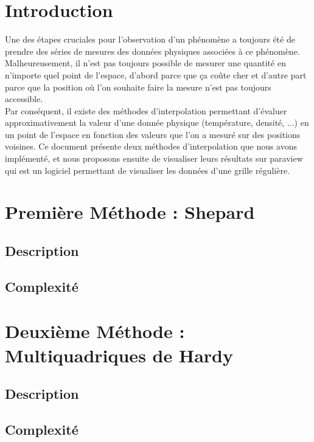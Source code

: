 \documentclass[a4paper,9pt]{article}
\begin{document}
\section{Introduction}
\label{sec:introduction}
Une des étapes cruciales pour l'observation d'un phénomène a toujours été de prendre des séries de mesures des données physiques associées à ce phénomène. Malheureusement, il n'est pas toujours possible de mesurer une quantité en n'importe quel point de l'espace, d'abord parce que ça coûte cher et d'autre part parce que la position où l'on souhaite faire la mesure n'est pas toujours accessible.\\ Par conséquent, il existe des méthodes d'interpolation permettant d'évaluer approximativement la valeur d'une donnée physique (température, densité, ...) en un point de l'espace en fonction des valeurs que l'on a mesuré sur des positions voisines. Ce document présente deux méthodes d'interpolation que nous avons implémenté, et nous proposons ensuite de visualiser leurs résultats sur paraview qui est un logiciel permettant de visualiser les données d'une grille régulière.

\section{Première Méthode : Shepard}
\label{sec:shepard}

\subsection{Description}
\label{subsec:shepard_description}

\subsection{Complexité}
\label{subsec:shepard_complexite}

\section{Deuxième Méthode : Multiquadriques de Hardy}
\label{sec:hardy}

\subsection{Description}
\label{subsec:hardy_description}

\subsection{Complexité}
\label{subsec:hardy_complexite}
\end{document}
